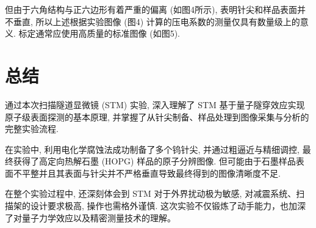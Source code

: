 \documentclass{whureport}
\begin{document}
\begin{multicols}{2}
但由于六角结构与正六边形有着严重的偏离 (如图4所示), 表明针尖和样品表面并不垂直, 所以上述根据实验图像 (图4) 计算的压电系数的测量仅具有数量级上的意义. 标定通常应使用高质量的标准图像 (如图5).

\section{总结}
通过本次扫描隧道显微镜 (STM) 实验, 深入理解了 STM 基于量子隧穿效应实现原子级表面探测的基本原理, 并掌握了从针尖制备、样品处理到图像采集与分析的完整实验流程.

在实验中, 利用电化学腐蚀法成功制备了多个钨针尖, 并通过粗逼近与精细调控, 最终获得了高定向热解石墨 (HOPG) 样品的原子分辨图像. 但可能由于石墨样品表面不平整并且其表面与针尖并不严格垂直导致最终得到的图像清晰度不足.

在整个实验过程中, 还深刻体会到 STM 对于外界扰动极为敏感, 对减震系统、扫描架的设计要求极高, 操作也需格外谨慎. 这次实验不仅锻炼了动手能力，也加深了对量子力学效应以及精密测量技术的理解。

\end{multicols}
\end{document}
